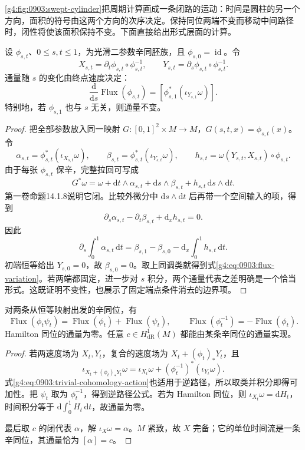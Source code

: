 

\cref{g4:fig:0903:swept-cylinder}把周期计算画成一条闭路的运动：时间是圆柱的另一个方向，面积的符号由这两个方向的次序决定。保持同位两端不变而移动中间路径时，闭性将使该面积保持不变。下面直接给出形式层面的计算。

\begin{theorem}\label{g4:thm:0903:flux-homotopy}
	设 \(\phi_{s,t}\)、\(0\le s,t\le1\)，为光滑二参数辛同胚族，且 \(\phi_{s,0}=\operatorname{id}\)。令
	\[
		X_{s,t}=\partial_t\phi_{s,t}\circ\phi_{s,t}^{-1},\qquad
		Y_{s,t}=\partial_s\phi_{s,t}\circ\phi_{s,t}^{-1}.
	\]
	通量随 \(s\) 的变化由终点速度决定：
	\begin{equation}\label{g4:eq:0903:flux-variation}
		\frac{\mathrm{d}}{\mathrm{d}s}\operatorname{Flux}(\phi_{s,t})
		=[\phi_{s,1}^*(\iota_{Y_{s,1}}\omega)].
	\end{equation}
	特别地，若 \(\phi_{s,1}\) 也与 \(s\) 无关，则通量不变。
\end{theorem}
\begin{proof}
	把全部参数放入同一映射 \(G:[0,1]^2\times M\to M\)，\(G(s,t,x)=\phi_{s,t}(x)\)。令
	\[
		\alpha_{s,t}=\phi_{s,t}^*(\iota_{X_{s,t}}\omega),\qquad
		\beta_{s,t}=\phi_{s,t}^*(\iota_{Y_{s,t}}\omega),\qquad
		h_{s,t}=\omega(Y_{s,t},X_{s,t})\circ\phi_{s,t}.
	\]
	由于每张 \(\phi_{s,t}\) 保辛，完整拉回可写成
	\[
		G^*\omega=\omega+\mathrm{d}t\wedge\alpha_{s,t}
		+\mathrm{d}s\wedge\beta_{s,t}
		+h_{s,t}\,\mathrm{d}s\wedge\mathrm{d}t.
	\]
	第一卷命题14.1.8说明它闭。比较外微分中 \(\mathrm{d}s\wedge\mathrm{d}t\) 后再带一个空间输入的项，得到
	\[
		\partial_s\alpha_{s,t}-\partial_t\beta_{s,t}
		+\mathrm{d}_x h_{s,t}=0.
	\]
	因此
	\[
		\partial_s\int_0^1\alpha_{s,t}\,\mathrm{d}t
		=\beta_{s,1}-\beta_{s,0}
		-\mathrm{d}_x\int_0^1h_{s,t}\,\mathrm{d}t.
	\]
	初端恒等给出 \(Y_{s,0}=0\)，故 \(\beta_{s,0}=0\)。取上同调类就得到式\eqref{g4:eq:0903:flux-variation}。若两端都固定，进一步对 \(s\) 积分，两个通量代表之差明确是一个恰当形式。这既证明不变性，也展示了固定端点条件消去的边界项。
\end{proof}

\begin{proposition}\label{g4:prop:0903:flux-composition}
	对两条从恒等映射出发的辛同位，有
	\[
		\operatorname{Flux}(\phi_t\psi_t)
		=\operatorname{Flux}(\phi_t)+\operatorname{Flux}(\psi_t),\qquad
		\operatorname{Flux}(\phi_t^{-1})=-\operatorname{Flux}(\phi_t).
	\]
	Hamilton 同位的通量为零。任意 \(c\in H^1_{\mathrm{dR}}(M)\) 都能由某条辛同位的通量实现。
\end{proposition}
\begin{proof}
	若两速度场为 \(X_t,Y_t\)，复合的速度场为 \(X_t+(\phi_t)_*Y_t\)，且
	\[
		\iota_{X_t+(\phi_t)_*Y_t}\omega
		=\iota_{X_t}\omega+(\phi_t^{-1})^*(\iota_{Y_t}\omega).
	\]
	式\eqref{g4:eq:0903:trivial-cohomology-action}也适用于逆路径，所以取类并积分即得可加性。把 \(\psi_t\) 取为 \(\phi_t^{-1}\)，得到逆路径公式。若为 Hamilton 同位，则 \(\iota_{X_t}\omega=\mathrm{d}H_t\)，时间积分等于 \(\mathrm{d}\int_0^1H_t\,\mathrm{d}t\)，故通量为零。

	最后取 \(c\) 的闭代表 \(\alpha\)，解 \(\iota_X\omega=\alpha\)。\(M\) 紧致，故 \(X\) 完备；它的单位时间流是一条辛同位，其通量恰为 \([\alpha]=c\)。
\end{proof}

